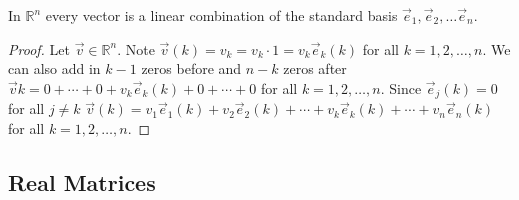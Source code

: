 \begin{example}
In $\mathbb{R}^n$ every vector is a linear combination of the standard basis $\vec{e}_1, \vec{e}_2, \ldots \vec{e}_n$.
\begin{proof}
Let $\vec{v} \in \mathbb{R}^n$. 
Note $\vec{v}(k)=v_k=v_k\cdot 1=v_k \vec{e}_k(k)$ for all $k = 1,2,\ldots,n$. 
We can also add in $k-1$ zeros before and $n-k$ zeros after
$\vec{v}{k}=0+ \cdots + 0+v_k\vec{e}_k(k)+0+\cdots+0$ for all $k = 1,2,\ldots,n$.  
Since $\vec{e}_j(k)=0$ for all $j\neq k$ $\vec{v}(k)=v_1\vec{e}_1(k)+v_2\vec{e}_2(k)+\cdots+ v_k\vec{e}_k(k)+ \cdots + v_n\vec{e}_n(k)$  for all $k = 1,2,\ldots,n$.  
\end{proof}
\end{example}

\subsection{Real Matrices}

